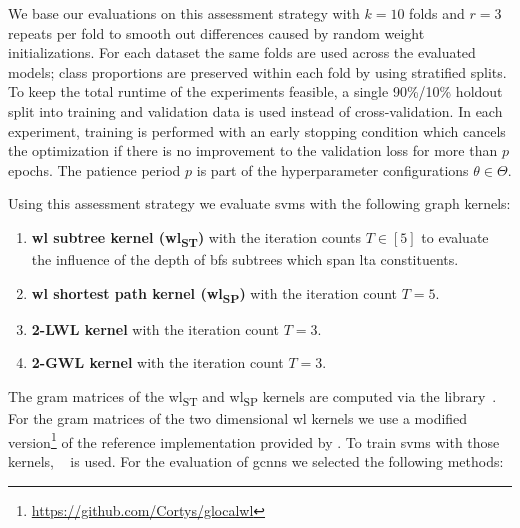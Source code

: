 We base our evaluations on this assessment strategy with $k = 10$ folds and $r = 3$ repeats per fold to smooth out differences caused by random weight initializations.
For each dataset the same folds are used across the evaluated models; class proportions are preserved within each fold by using stratified splits.
To keep the total runtime of the experiments feasible, a single 90\%/10\% holdout split into training and validation data is used instead of cross-validation.
In each experiment, training is performed with an early stopping condition which cancels the optimization if there is no improvement to the validation loss for more than $p$ epochs.
The patience period $p$ is part of the hyperparameter configurations $\theta \in \Theta$.

Using this assessment strategy we evaluate \acp{svm} with the following graph kernels:
\begin{enumerate}[label={\textbf{\arabic*.}},itemsep=2pt,parsep=2pt]
	\item \textbf{\ac{wl} subtree kernel (\acs{wl}\textsubscript{ST})} with the iteration counts $T \in [5]$ to evaluate the influence of the depth of \ac{bfs} subtrees which span \ac{lta} constituents.
	\item \textbf{\ac{wl} shortest path kernel (\acs{wl}\textsubscript{SP})} with the iteration count $T = 5$.
	\item \textbf{2-LWL kernel} with the iteration count $T = 3$.
	\item \textbf{2-GWL kernel} with the iteration count $T = 3$.
\end{enumerate}
The gram matrices of the \acs{wl}\textsubscript{ST} and \acs{wl}\textsubscript{SP} kernels are computed via the  library~\cite{Siglidis2018}\cite{GK}.
For the gram matrices of the two dimensional \ac{wl} kernels we use a modified version\footnote{\url{https://github.com/Cortys/glocalwl}} of the reference implementation provided by \citet{Morris2017}.
To train \acp{svm} with those kernels, ~\cite{Pedregosa2011}\cite{SKL} is used.
For the evaluation of \acp{gcnn} we selected the following methods:
